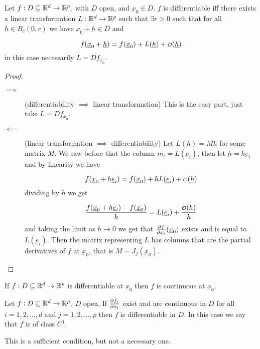 \documentclass[12pt]{report}
\renewcommand{\vec}[1]{\underbar{\ensuremath{#1}}}
\begin{document}
\begin{proposition}
    Let $f: D \subseteq \mathbb{R}^d \to \mathbb{R}^p$, with $D$ open, and $\vec{x}_0 \in D$.
    $f$ is differentiable iff there exists a linear transformation $L: \mathbb{R}^d \to \mathbb{R}^p$ such that $\exists r > 0$ such that for all $\vec{h} \in B_c(\vec{0}, r)$ we have $\vec{x}_0 + \vec{h} \in D$ and

    $$
        f(\vec{x}_0 + \vec{h}) = f(\vec{x}_0) + L(\vec{h}) + \o(\vec{h})
    $$
    in this case necessarily $L = Df_{\vec{x}_0}$.
\end{proposition}

\begin{proof}
    \skiplineafterproof
    \begin{description}
        \item[$\implies$] (differentiability $\implies$ linear transformation)
            This is the easy part, just take $L = Df_{\vec{x}_0}$.
        \item[$\impliedby$] (linear transformation $\implies$ differentiability)
            Let $L(\vec{h}) = M \vec{h}$ for some matrix $M$.
            We saw before that the column $m_i = L(\vec{e}_i)$, then let $\vec{h} = h \vec{e}_i$ and by linearity we have

            $$
                f(\vec{x}_0 + h \vec{e}_i) = f(\vec{x}_0) + h L(\vec{e}_i) + \o(h)
            $$
            dividing by $h$ we get

            $$
                \frac{f(\vec{x}_0 + h \vec{e}_i) - f(\vec{x}_0)}{h} = L(\vec{e}_i) + \frac{\o(h)}{h}
            $$
            and taking the limit as $h \to 0$ we get that $\pdv{f}{x_i}()(\vec{x}_0)$ exists and is equal to $L(\vec{e}_i)$.
            Then the matrix representing $L$ has columns that are the partial derivatives of $f$ at $\vec{x}_0$, that is $M = J_f(\vec{x}_0)$.
    \end{description}
\end{proof}

\begin{proposition}
    If $f: D \subseteq \mathbb{R}^d \to \mathbb{R}^p$ is differentiable at $\vec{x}_0$ then $f$ is continuous at $\vec{x}_0$.
\end{proposition}

\begin{theorem}
    Let $f: D \subseteq \mathbb{R}^d \to \mathbb{R}^p$, $D$ open. If $\pdv{f_j}{x_i}()$ exist and are continuous in $D$ for all $i = 1, 2, \ldots, d$ and $j = 1, 2, \ldots, p$ then $f$ is differentiable in $D$.
    In this case we say that $f$ is of class $C^1$.
\end{theorem}
\begin{remark}
    This is a sufficient condition, but not a necessary one.
\end{remark}
\end{document}

